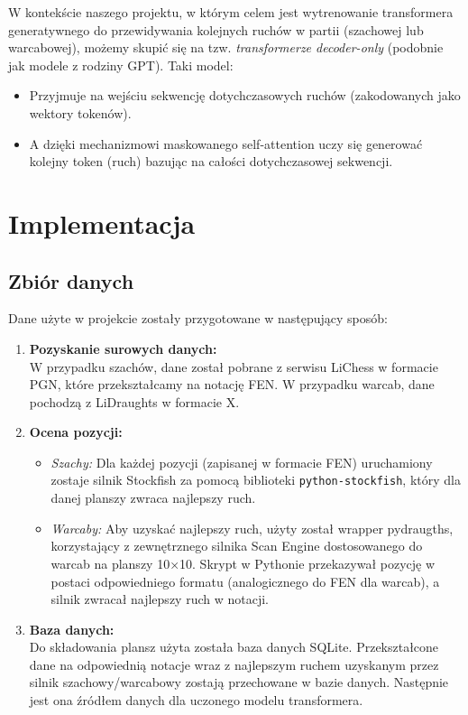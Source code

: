 \documentclass[12pt]{article}
\begin{document}
W kontekście naszego projektu, w którym celem jest wytrenowanie transformera generatywnego do przewidywania kolejnych ruchów w partii (szachowej lub warcabowej), możemy skupić się na tzw. \emph{transformerze decoder-only} (podobnie jak modele z rodziny GPT). Taki model:
\begin{itemize}
    \item Przyjmuje na wejściu sekwencję dotychczasowych ruchów (zakodowanych jako wektory tokenów).
    \item A dzięki mechanizmowi maskowanego self-attention uczy się generować kolejny token (ruch) bazując na całości dotychczasowej sekwencji.
\end{itemize}



\section{Implementacja}
\subsection{Zbiór danych}
Dane użyte w projekcie zostały przygotowane w następujący sposób:
\begin{enumerate}
    \item \textbf{Pozyskanie surowych danych:}
    \\W przypadku szachów, dane został pobrane z serwisu LiChess w formacie PGN, które przekształcamy na notację FEN. W przypadku warcab, dane pochodzą z LiDraughts w formacie X.
    \item \textbf{Ocena pozycji:}
    \begin{itemize}
        \item \emph{Szachy:} Dla każdej pozycji (zapisanej w formacie FEN) uruchamiony zostaje silnik Stockfish za pomocą biblioteki \texttt{python-stockfish}, który dla danej planszy zwraca najlepszy ruch. 
        \item \emph{Warcaby:} Aby uzyskać najlepszy ruch, użyty został wrapper pydraugths, korzystający z zewnętrznego silnika Scan Engine dostosowanego do warcab na planszy 10×10. Skrypt w Pythonie przekazywał pozycję w postaci odpowiedniego formatu (analogicznego do FEN dla warcab), a silnik zwracał najlepszy ruch w notacji. 
    \end{itemize}
    \item \textbf{Baza danych:}
    \\Do składowania plansz użyta została baza danych SQLite. Przekształcone dane na odpowiednią notacje wraz z najlepszym ruchem uzyskanym przez silnik szachowy/warcabowy zostają przechowane w bazie danych. Następnie jest ona źródłem danych dla uczonego modelu transformera. 
\end{enumerate}
\end{document}
